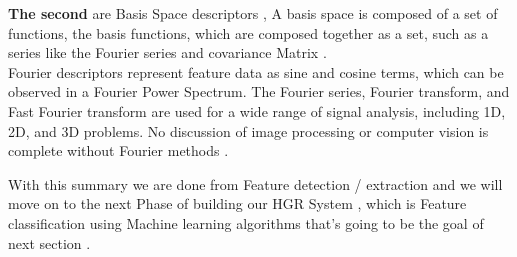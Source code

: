 \textbf{The second } are Basis Space descriptors   , A basis space is composed of a set of functions, the basis functions, which are
composed together as a set, such as a series like the Fourier series and covariance Matrix  . \\
Fourier descriptors represent feature data as sine and cosine terms, which can be
observed in a Fourier Power Spectrum. The Fourier series, Fourier transform, and Fast
Fourier transform are used for a wide range of signal analysis, including 1D, 2D, and 3D
problems. No discussion of image processing or computer vision is complete without
Fourier methods .

With this summary we are done from Feature detection / extraction and we will move on to the next Phase of building  our HGR System , which is  Feature classification using Machine learning algorithms that's going to be the goal of next section .